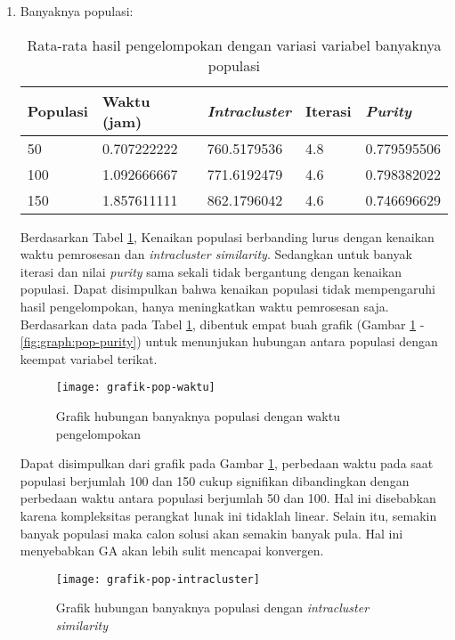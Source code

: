 \begin{enumerate}
	\item Banyaknya populasi:
		\begin{table}[H]
			\centering
			\begin{tabular}{|l|l|l|l|l|} \hline
				Populasi & Waktu (jam) & \textit{Intracluster} & Iterasi& \textit{Purity} \\ \hline
				50  & 0.707222222 & 760.5179536 & 4.8 & 0.779595506 \\
				100 & 1.092666667 & 771.6192479 & 4.6 & 0.798382022 \\
				150 & 1.857611111 & 862.1796042 & 4.6 & 0.746696629 \\ \hline
			\end{tabular}
			\caption{Rata-rata hasil pengelompokan dengan variasi variabel banyaknya populasi}
			\label{tbl:exp-pop}
		\end{table}
		
		Berdasarkan Tabel \ref{tbl:exp-pop}, Kenaikan populasi berbanding lurus dengan kenaikan waktu pemrosesan dan \textit{intracluster similarity}. Sedangkan untuk banyak iterasi dan nilai \textit{purity} sama sekali tidak bergantung dengan kenaikan populasi. Dapat disimpulkan bahwa kenaikan populasi tidak mempengaruhi hasil pengelompokan, hanya meningkatkan waktu pemrosesan saja. Berdasarkan data pada Tabel \ref{tbl:exp-pop}, dibentuk empat buah grafik (Gambar \ref{fig:graph:pop-time} - \ref{fig:graph:pop-purity}) untuk menunjukan hubungan antara populasi dengan keempat variabel terikat.
		
		\begin{figure}[H]
			\centering
			\texttt{[image: grafik-pop-waktu]}
			\caption{Grafik hubungan banyaknya populasi dengan waktu pengelompokan}
			\label{fig:graph:pop-time}
		\end{figure}
		
		Dapat disimpulkan dari grafik pada Gambar \ref{fig:graph:pop-time}, perbedaan waktu pada saat populasi berjumlah 100 dan 150 cukup signifikan dibandingkan dengan perbedaan waktu antara populasi berjumlah 50 dan 100. Hal ini disebabkan karena kompleksitas perangkat lunak ini tidaklah linear. Selain itu, semakin banyak populasi maka calon solusi akan semakin banyak pula. Hal ini menyebabkan GA akan lebih sulit mencapai konvergen.
		
		\begin{figure}[H]
			\centering
			\texttt{[image: grafik-pop-intracluster]}
			\caption{Grafik hubungan banyaknya populasi dengan \textit{intracluster similarity}}
			\label{fig:graph:pop-intra}
		\end{figure}
		

\end{enumerate}
